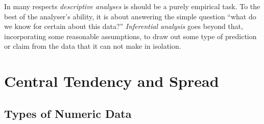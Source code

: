 In many respects \textit{descriptive analyses} is should be a purely empirical task. To the best of the analyser's ability, it is about answering the simple question ``what do we know for certain about this data?''  \textit{Inferential analysis} goes beyond that, incorporating some reasonable assumptions, to draw out some type of prediction or claim from the data that it can not make in isolation.


\section{Central Tendency and Spread}

\subsection{Types of Numeric Data}